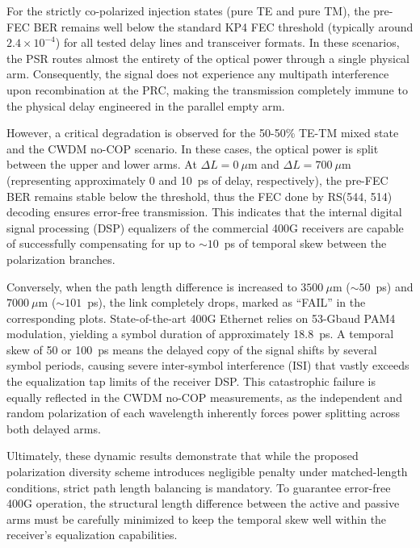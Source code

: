 For the strictly co-polarized injection states (pure TE and pure TM), the pre-FEC BER remains well 
below the standard KP4 FEC threshold (typically around $2.4 \times 10^{-4}$) 
\cite{ieee_802_3ck-2022} for all tested delay lines and transceiver formats. In these scenarios, 
the PSR routes almost the entirety of the optical power through a single physical arm. 
Consequently, the signal does not experience any multipath interference upon recombination at the 
PRC, making the transmission completely immune to the physical delay engineered in the parallel 
empty arm.

However, a critical degradation is observed for the 50-50\% TE-TM mixed state and the CWDM no-COP 
scenario. In these cases, the optical power is split between the upper and lower arms. 
At $\Delta L = 0~\mu\mathrm{m}$ and $\Delta L = 700~\mu\mathrm{m}$ (representing approximately 0 
and 10~ps of delay, respectively), the pre-FEC BER remains stable below the threshold, thus the 
FEC done by RS(544, 514) decoding ensures error-free transmission. This indicates that the internal 
digital signal processing (DSP) equalizers of the commercial 400G receivers are capable of 
successfully compensating for up to $\sim 10$~ps of temporal skew between the polarization 
branches.

Conversely, when the path length difference is increased to $3500~\mu\mathrm{m}$ 
($\sim 50$~ps) and $7000~\mu\mathrm{m}$ ($\sim 101$~ps), the link completely drops, marked as 
``FAIL'' in the corresponding plots. State-of-the-art 400G Ethernet relies on 53-Gbaud PAM4 
modulation, yielding a symbol duration of approximately 18.8~ps. A temporal skew of 50 or 100~ps 
means the delayed copy of the signal shifts by several symbol periods, causing severe inter-symbol 
interference (ISI) that vastly exceeds the equalization tap limits of the receiver DSP. This 
catastrophic failure is equally reflected in the CWDM no-COP measurements, as the independent and 
random polarization of each wavelength inherently forces power splitting across both delayed arms.

Ultimately, these dynamic results demonstrate that while the proposed polarization diversity scheme 
introduces negligible penalty under matched-length conditions, strict path length balancing is 
mandatory. To guarantee error-free 400G operation, the structural length difference between the 
active and passive arms must be carefully minimized to keep the temporal skew well within the 
receiver's equalization capabilities.

